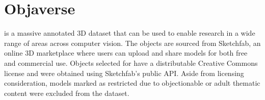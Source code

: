 \vspace{-0.075in}

\section{Objaverse}
\label{sec:objaverse}

\data is a massive annotated 3D dataset that can be used to enable research in a wide range of areas across computer vision.
The objects are sourced from Sketchfab, an online 3D marketplace where users can upload and share models for both free and commercial use. Objects selected for \data have a distributable Creative Commons license and were obtained using Sketchfab’s public API. Aside from licensing consideration, models marked as restricted due to objectionable or adult thematic content were excluded from the dataset.

